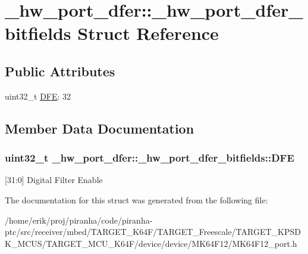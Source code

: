 \hypertarget{struct__hw__port__dfer_1_1__hw__port__dfer__bitfields}{}\section{\+\_\+hw\+\_\+port\+\_\+dfer\+:\+:\+\_\+hw\+\_\+port\+\_\+dfer\+\_\+bitfields Struct Reference}
\label{struct__hw__port__dfer_1_1__hw__port__dfer__bitfields}
\subsection*{Public Attributes}
\begin{DoxyCompactItemize}
\item 
uint32\+\_\+t \hyperlink{struct__hw__port__dfer_1_1__hw__port__dfer__bitfields_a5e203ee72beaa241d5407129ab20e801}{D\+FE}\+: 32
\end{DoxyCompactItemize}


\subsection{Member Data Documentation}
\subsubsection[{\texorpdfstring{D\+FE}{DFE}}]{\setlength{\rightskip}{0pt plus 5cm}uint32\+\_\+t \+\_\+hw\+\_\+port\+\_\+dfer\+::\+\_\+hw\+\_\+port\+\_\+dfer\+\_\+bitfields\+::\+D\+FE}\hypertarget{struct__hw__port__dfer_1_1__hw__port__dfer__bitfields_a5e203ee72beaa241d5407129ab20e801}{}\label{struct__hw__port__dfer_1_1__hw__port__dfer__bitfields_a5e203ee72beaa241d5407129ab20e801}
\mbox{[}31\+:0\mbox{]} Digital Filter Enable 

The documentation for this struct was generated from the following file\+:\begin{DoxyCompactItemize}
\item 
/home/erik/proj/piranha/code/piranha-\/ptc/src/receiver/mbed/\+T\+A\+R\+G\+E\+T\+\_\+\+K64\+F/\+T\+A\+R\+G\+E\+T\+\_\+\+Freescale/\+T\+A\+R\+G\+E\+T\+\_\+\+K\+P\+S\+D\+K\+\_\+\+M\+C\+U\+S/\+T\+A\+R\+G\+E\+T\+\_\+\+M\+C\+U\+\_\+\+K64\+F/device/device/\+M\+K64\+F12/M\+K64\+F12\+\_\+port.\+h\end{DoxyCompactItemize}

